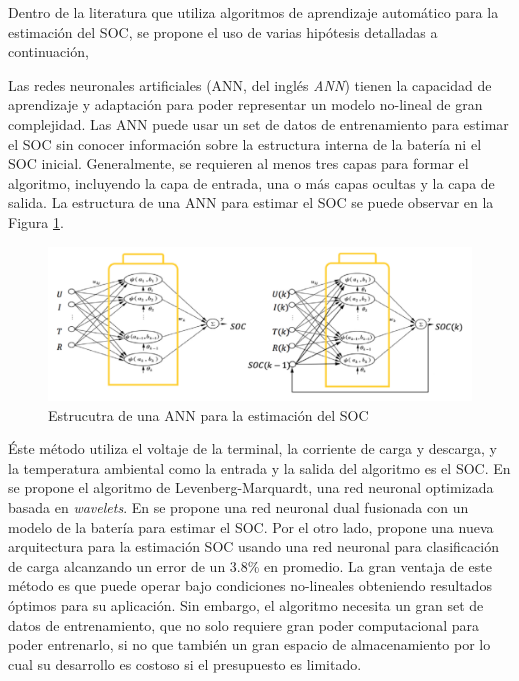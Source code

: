 \documentclass[10pt,a4paper]{article}
\newcounter{subsubsubsection}[subsubsection]
\begin{document}
\noindent Dentro de la literatura que utiliza algoritmos de aprendizaje
autom\'atico para la estimaci\'on del \acrshort{SOC}, se propone el uso de
varias hip\'otesis detalladas a continuaci\'on,


\noindent Las redes neuronales artificiales (\acrshort{ANN}, del ingl\'es
\emph{\acrlong{ANN}}) tienen la capacidad de aprendizaje y adaptaci\'on para
poder representar un modelo no-lineal de gran complejidad. Las \acrshort{ANN}
puede usar un set de datos de entrenamiento para estimar el \acrshort{SOC} sin
conocer informaci\'on sobre la estructura interna de la bater\'ia ni el
\acrshort{SOC} inicial. Generalmente, se requieren al menos tres capas para
formar el algoritmo, incluyendo la capa de entrada, una o m\'as capas ocultas y
la capa de salida. La estructura de una \acrshort{ANN} para estimar el
\acrshort{SOC} se puede observar en la Figura \ref{ann_soc_layers}.

\begin{figure}[h!]
    \begin{center}
        \includegraphics[width=1\textwidth]{ann_soc.png}
        \caption{Estrucutra de una \acrshort{ANN} para la estimaci\'on del
        \acrshort{SOC}}
        \label{ann_soc_layers}
    \end{center}
\end{figure}

\noindent \'Este m\'etodo utiliza el voltaje de la terminal, la corriente de
carga y descarga, y la temperatura ambiental como la entrada y la salida del
algoritmo es el \acrshort{SOC}. En \cite{XIA2018694} se propone el algoritmo
de Levenberg-Marquardt, una red neuronal optimizada basada en \emph{wavelets}.
En \cite{DANG2016356} se propone una red neuronal dual fusionada con un modelo 
de la bater\'ia para estimar el \acrshort{SOC}. Por el otro lado, 
\cite{TONG2016236} propone una nueva arquitectura para la estimaci\'on 
\acrshort{SOC} usando una red neuronal para clasificaci\'on de carga alcanzando 
un error de un 3.8\% en promedio. La gran ventaja de este m\'etodo es que puede 
operar bajo condiciones no-lineales obteniendo resultados \'optimos para su 
aplicaci\'on. Sin embargo, el algoritmo necesita un gran set de datos de 
entrenamiento, que no solo requiere gran poder computacional para poder 
entrenarlo, si no que tambi\'en un gran espacio de almacenamiento por lo cual su 
desarrollo es costoso si el presupuesto es limitado.
\end{document}
